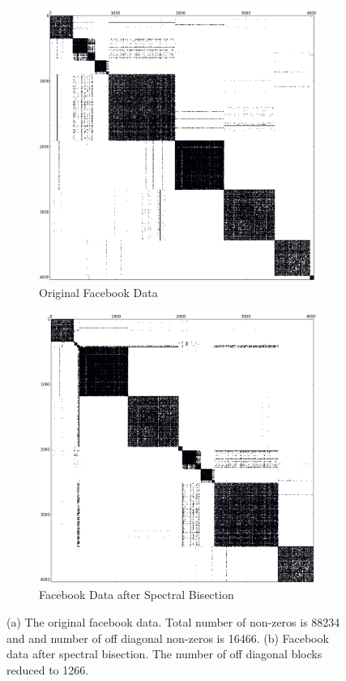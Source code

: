 \documentclass[11pt]{article}
\begin{document}
\begin{figure}
\centering
\begin{subfigure}{.5\textwidth}
	\centering
	\includegraphics[width=.9\linewidth]{figs/Facebook_Original.png}
	\caption{Original Facebook Data}
	\label{fig:FB}
\end{subfigure}%
\begin{subfigure}{.5\textwidth}
		\centering
		\includegraphics[width=.9\linewidth]{figs/Facebook_SB_C0.png}
		\caption{Facebook Data after Spectral Bisection}
		\label{fig:sub2}
	\end{subfigure}
	\caption{ (a) The original facebook data. Total number of
non-zeros is 88234 and and number of off diagonal non-zeros is 16466. (b)
Facebook data after spectral bisection. The number of off diagonal blocks
reduced to 1266. } 
	\label{fig:FBSB}
\end{figure}
\end{document}
